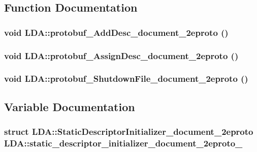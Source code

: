 \subsection{Function Documentation}
\hypertarget{namespace_l_d_a_a0e92f0f45237dbf05ed3e40d1d937424}{
\subsubsection[{protobuf\_\-AddDesc\_\-document\_\-2eproto}]{\setlength{\rightskip}{0pt plus 5cm}void LDA::protobuf\_\-AddDesc\_\-document\_\-2eproto ()}}
\label{namespace_l_d_a_a0e92f0f45237dbf05ed3e40d1d937424}
\hypertarget{namespace_l_d_a_a9c33eff2aecb2f5f4b81b24bf436dd34}{
\subsubsection[{protobuf\_\-AssignDesc\_\-document\_\-2eproto}]{\setlength{\rightskip}{0pt plus 5cm}void LDA::protobuf\_\-AssignDesc\_\-document\_\-2eproto ()}}
\label{namespace_l_d_a_a9c33eff2aecb2f5f4b81b24bf436dd34}
\hypertarget{namespace_l_d_a_abcd9acc44a8c440081fa76409c9083dd}{
\subsubsection[{protobuf\_\-ShutdownFile\_\-document\_\-2eproto}]{\setlength{\rightskip}{0pt plus 5cm}void LDA::protobuf\_\-ShutdownFile\_\-document\_\-2eproto ()}}
\label{namespace_l_d_a_abcd9acc44a8c440081fa76409c9083dd}


\subsection{Variable Documentation}
\hypertarget{namespace_l_d_a_a653847a5d3b27abb88be2fb3b865619d}{
\subsubsection[{static\_\-descriptor\_\-initializer\_\-document\_\-2eproto\_\-}]{\setlength{\rightskip}{0pt plus 5cm}struct {\bf LDA::StaticDescriptorInitializer\_\-document\_\-2eproto}  {\bf LDA::static\_\-descriptor\_\-initializer\_\-document\_\-2eproto\_\-}}}
\label{namespace_l_d_a_a653847a5d3b27abb88be2fb3b865619d}
